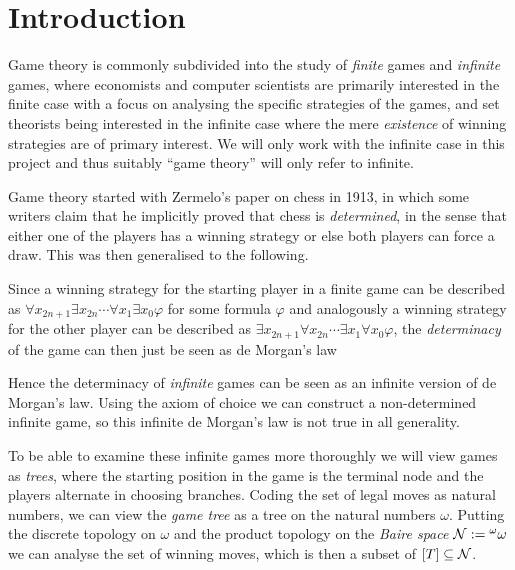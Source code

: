 \chapter{Introduction}
\thispagestyle{fancy}
\setlength{\parindent}{18pt}

\begin{onehalfspacing}

Game theory is commonly subdivided into the study of \textit{finite} games and \textit{infinite} games, where economists and computer scientists are primarily interested in the finite case with a focus on analysing the specific strategies of the games, and set theorists being interested in the infinite case where the mere \textit{existence} of winning strategies are of primary interest. We will only work with the infinite case in this project and thus suitably ``game theory'' will only refer to infinite.

Game theory started with Zermelo's paper \cite{Zermelo} on chess in 1913, in which some writers claim that he implicitly proved that chess is \textit{determined}, in the sense that either one of the players has a winning strategy or else both players can force a draw. This was then generalised to the following.


Since a winning strategy for the starting player in a finite game can be described as $\forall x_{2n+1}\exists x_{2n}\cdots\forall x_1\exists x_0\varphi$ for some formula $\varphi$ and analogously a winning strategy for the other player can be described as $\exists x_{2n+1}\forall x_{2n}\cdots\exists x_1\forall x_0\varphi$, the \textit{determinacy} of the game can then just be seen as de Morgan's law

Hence the determinacy of \textit{infinite} games can be seen as an infinite version of de Morgan's law. Using the axiom of choice we can construct a non-determined infinite game, so this infinite de Morgan's law is not true in all generality.

To be able to examine these infinite games more thoroughly we will view games as \textit{trees}, where the starting position in the game is the terminal node and the players alternate in choosing branches. Coding the set of legal moves as natural numbers, we can view the \textit{game tree} as a tree on the natural numbers $\omega$. Putting the discrete topology on $\omega$ and the product topology on the \textit{Baire space} $\operatorname{\mathcal{N}}:={^\omega}\omega$ we can analyse the set of winning moves, which is then a subset of $[T]\subseteq\operatorname{\mathcal{N}}$.


\end{onehalfspacing}
